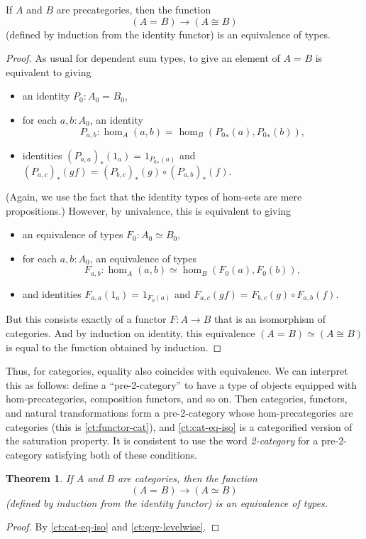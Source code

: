\documentclass{amsart}
\newcommand{\id}[3][]{\ensuremath{#2 =_{#1} #3}\xspace}
\newcommand{\trans}[2]{\ensuremath{{#1}_{*}\!\left({#2}\right)}\xspace}
\newcommand{\eqv}[2]{\ensuremath{#1 \simeq #2}\xspace}
\newtheorem{thm}{Theorem}[section]
\theoremstyle{definition}
\theoremstyle{remark}
\numberwithin{equation}{section}
\begin{document}
\begin{lem}\label{ct:cat-eq-iso}
  If $A$ and $B$ are precategories, then the function
  \[(\id A B) \to (A\cong B)\]
  (defined by induction from the identity functor) is an equivalence of types.
\end{lem}
\begin{proof}
  As usual for dependent sum types, to give an element of $\id A B$ is equivalent to giving
  \begin{itemize}
  \item an identity $P_0:\id{A_0}{B_0}$,
  \item for each $a,b:A_0$, an identity
    \[P_{a,b}:\id{\hom_A(a,b)}{\hom_B(\trans {P_0} a,\trans {P_0} b)},\]
  \item identities $\id{\trans {(P_{a,a})} {1_a}}{1_{\trans {P_0} a}}$ and $\id{\trans {(P_{a,c})} {gf}}{\trans {(P_{b,c})} g \circ \trans {(P_{a,b})} f}$.
  \end{itemize}
  (Again, we use the fact that the identity types of hom-sets are mere propositions.)
  However, by univalence, this is equivalent to giving
  \begin{itemize}
  \item an equivalence of types $F_0:\eqv{A_0}{B_0}$,
  \item for each $a,b:A_0$, an equivalence of types
    \[F_{a,b}:\eqv{\hom_A(a,b)}{\hom_B(F_0 (a),F_0 (b))},\]
  \item and identities $\id{F_{a,a}(1_a)}{1_{F_0 (a)}}$ and $\id{F_{a,c}(gf)}{F_{b,c} (g)\circ F_{a,b} (f)}$.
  \end{itemize}
  But this consists exactly of a functor $F:A\to B$ that is an isomorphism of categories.
  And by induction on identity, this equivalence $\eqv{(\id A B)}{(A\cong B)}$ is equal to the function obtained by induction.
\end{proof}

Thus, for categories, equality also coincides with equivalence.
We can interpret this as follows: define a ``pre-2-category'' to have a type of objects equipped with hom-precategories, composition functors, and so on.
Then categories, functors, and natural transformations form a pre-2-category whose hom-precategories are categories (this is \autoref{ct:functor-cat}), and \autoref{ct:cat-eq-iso} is a categorified version of the saturation property.
It is consistent to use the word \emph{2-category} for a pre-2-category satisfying both of these conditions.

\begin{thm}\label{ct:cat-2cat}
  If $A$ and $B$ are categories, then the function
  \[(\id A B) \to (A\simeq B)\]
  (defined by induction from the identity functor) is an equivalence of types.
\end{thm}
\begin{proof}
  By \autoref{ct:cat-eq-iso} and \autoref{ct:eqv-levelwise}.
\end{proof}
\end{document}
